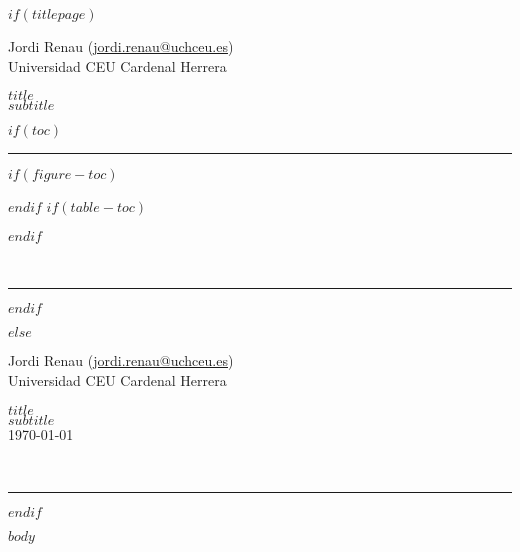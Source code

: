 \documentclass[11pt,a4paper,twoside,onecolumn,notitlepage,final]{scrartcl}
\date{$date$}
\newcommand{\mititulo}{ $title$ }
\newcommand{\misubtitulo}{ $subtitle$ }
\begin{document}
	\renewcommand{\tablename}{Tabla}
	
	$if(titlepage)$
	\begin{titlepage}
		\begin{flushright}
			\large
			Jordi Renau (\href{mailto:jordi.renau@uchceu.es}{jordi.renau@uchceu.es}) \\
			Universidad CEU Cardenal Herrera %

		\Huge 
		\mititulo \\[0.5cm]
		\huge
		\misubtitulo \\[1.5cm]
	\end{flushright}
	$if(toc)$
	\hrule
	\renewcommand{\contentsname}{Contenidos \small (\textit{Actualizado}: \today)}
	
	\tableofcontents 
	$if(figure-toc)$
	\renewcommand{\listfigurename}{Lista de figuras}
	\listoffigures
	$endif$
	$if(table-toc)$
	\renewcommand{\listtablename}{Lista de tablas}
	\listoftables
	$endif$
	
	~
	
	\hrule
	$endif$
\end{titlepage}
$else$
		\begin{flushright}
			\thispagestyle{empty}
	\large
	Jordi Renau (\href{mailto:jordi.renau@uchceu.es}{jordi.renau@uchceu.es}) \\
	Universidad CEU Cardenal Herrera %

	\Huge 
	\mititulo \\[0.5cm]
	\huge
	\misubtitulo \\[0.5cm]
	\small \today
\end{flushright}
		~

\hrule
$endif$




$body$
\end{document}
